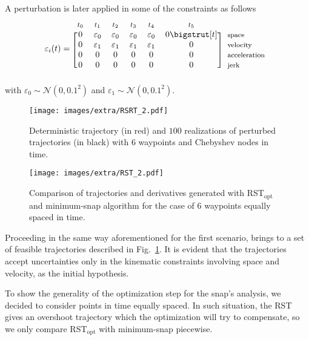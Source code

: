 A perturbation is later applied in some of the constraints as follows
\begin{equation*}
  \varepsilon_i(t)=
  \begin{blockarray}{*{6}{c} l}
    \begin{block}{*{6}{>{$\footnotesize}c<{$}} l}
      $t_0$ & $t_1$ & $t_2$ & $t_3$ & $t_4$ & $t_5$ \\
    \end{block}
    \begin{block}{[*{6}{c}]>{$\footnotesize}l<{$}}
      0 & \varepsilon_0 & \varepsilon_0 & \varepsilon_0 & \varepsilon_0 & 0 \bigstrut[t]& space \\
       0 & \varepsilon_1 & \varepsilon_1 & \varepsilon_1 & \varepsilon_1 & 0 & velocity \\
       0 & 0 & 0 & 0 & 0 & 0 & acceleration \\
       0 & 0 & 0 & 0 & 0 & 0 & jerk \\
    \end{block}
  \end{blockarray}
\end{equation*}
with $\varepsilon_0 \sim \mathcal{N}(0,0.1^2)$ and $\varepsilon_1 \sim \mathcal{N}(0,0.1^2)$.
\begin{figure}
\texttt{[image: images/extra/RSRT\_2.pdf]}
\centering
\caption{Deterministic trajectory (in red) and $100$ realizations of perturbed trajectories (in black) with $6$ waypoints and Chebyshev nodes in time.}
\label{fig:rst_RSRT_2}
\end{figure}
\begin{figure}
\texttt{[image: images/extra/RST\_2.pdf]}
\centering
\caption{Comparison of trajectories and derivatives generated with RST$_{\text{opt}}$ and minimum-snap algorithm for the case of $6$ waypoints equally spaced in time.}
\label{fig:rst_RST_2}
\end{figure}
Proceeding in the same way aforementioned for the first scenario, brings to a set of feasible trajectories described in Fig.~\ref{fig:rst_RSRT_2}. It is evident that the trajectories accept uncertainties only in the kinematic constraints involving space and velocity, as the initial hypothesis.

To show the generality of the optimization step for the snap's analysis, we decided to consider points in time equally spaced. In such situation, the RST gives an overshoot trajectory which the optimization will try to compensate, so we only compare RST$_{\text{opt}}$ with minimum-snap piecewise. 

